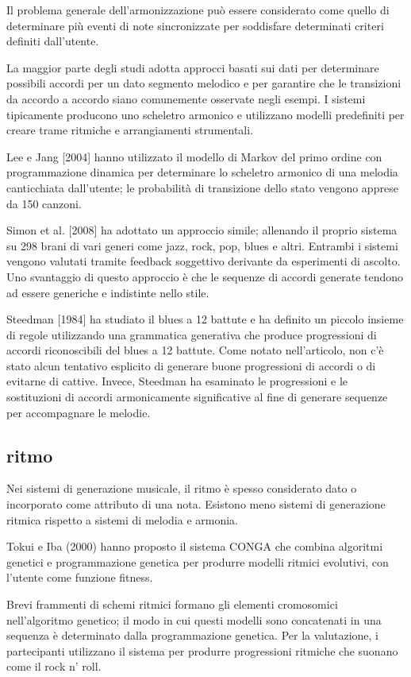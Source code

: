 \documentclass[a4paper,12pt]{report}
\begin{document}
Il problema generale dell'armonizzazione può essere considerato come quello di determinare più eventi di note sincronizzate per soddisfare determinati criteri definiti dall'utente.

La maggior parte degli studi adotta approcci basati sui dati per determinare possibili accordi per un dato segmento melodico e per garantire che le transizioni da accordo a accordo siano comunemente osservate negli esempi.
I sistemi tipicamente producono uno scheletro armonico e utilizzano modelli predefiniti per creare trame ritmiche e arrangiamenti strumentali.

Lee e Jang [2004] hanno utilizzato il modello di Markov del primo ordine con programmazione dinamica per determinare lo scheletro armonico di una melodia canticchiata dall'utente; 
le probabilità di transizione dello stato vengono apprese da 150 canzoni. 

Simon et al. [2008] ha adottato un approccio simile; allenando il proprio sistema su 298 brani di vari generi come jazz, rock, pop, blues e altri. Entrambi i sistemi vengono valutati tramite feedback soggettivo derivante da esperimenti di ascolto. 
Uno svantaggio di questo approccio è che le sequenze di accordi generate tendono ad essere generiche e indistinte nello stile.

Steedman [1984] ha studiato il blues a 12 battute e ha definito un piccolo insieme di regole utilizzando una grammatica generativa che produce progressioni di accordi riconoscibili del blues a 12 battute. 
Come notato nell'articolo, non c'è stato alcun tentativo esplicito di generare buone progressioni di accordi o di evitarne di cattive. Invece, Steedman ha esaminato le progressioni e le sostituzioni di accordi armonicamente significative al fine di generare sequenze per accompagnare le melodie.

\subsection*{ritmo}

Nei sistemi di generazione musicale, il ritmo è spesso considerato dato o incorporato come attributo di una nota. 
Esistono meno sistemi di generazione ritmica rispetto a sistemi di melodia e armonia.

Tokui e Iba (2000) hanno proposto il sistema CONGA che combina algoritmi genetici e programmazione genetica per produrre modelli ritmici evolutivi, con l'utente come funzione fitness.

Brevi frammenti di schemi ritmici formano gli elementi cromosomici nell'algoritmo genetico; il modo in cui questi modelli sono concatenati in una sequenza è determinato dalla programmazione genetica. 
Per la valutazione, i partecipanti utilizzano il sistema per produrre progressioni ritmiche che suonano come il rock n’ roll.
\end{document}
